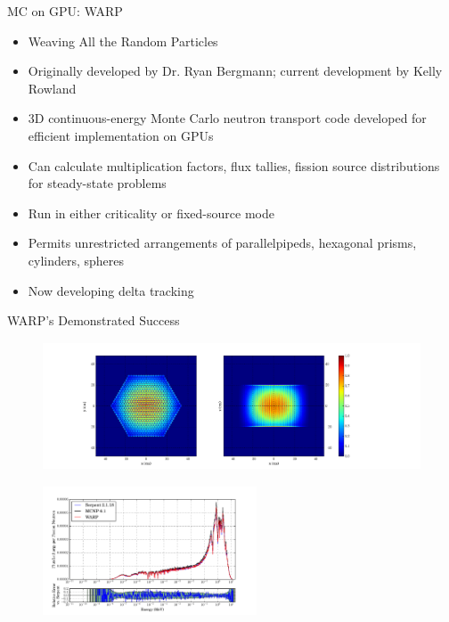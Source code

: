\documentclass[xcolor=x11names,compress]{beamer}
\renewcommand{\(}{\begin{columns}}
\renewcommand{\)}{\end{columns}}
\newcommand{\<}[1]{\begin{column}{#1}}
\renewcommand{\>}{\end{column}}
\begin{document}
\begin{frame}{MC on GPU: WARP \cite{warp}}
	\begin{itemize}
	\item{Weaving All the Random Particles}
	\pause
	\item{Originally developed by Dr. Ryan Bergmann; current development by Kelly Rowland}
	\pause
	\item{3D continuous-energy Monte Carlo neutron transport code developed
	     for efficient implementation on \alert{GPUs}}
	\item{Can calculate multiplication factors, flux tallies, fission source
	     distributions for steady-state problems}
	\item{Run in either criticality or fixed-source mode}
	\item{Permits unrestricted arrangements of parallelpipeds, hexagonal prisms, 
	     cylinders, spheres}
	\pause
	\item{Now developing \alert{delta tracking} \cite{woodcock}}
	\end{itemize}
\end{frame}

\begin{frame}{WARP's Demonstrated Success}
 
    \begin{center}
 	\begin{figure}     
 	\includegraphics[height=1.5in,clip]{../figs/assembly-fiss-6}
 	\end{figure}
 	\end{center}   
 	
 	\begin{center}
 	\begin{figure}     
 	\includegraphics[height=1.5in,clip]{../figs/assembly-spec-6}
 	\end{figure}
 	\end{center} 
 
\end{frame}
\end{document}

